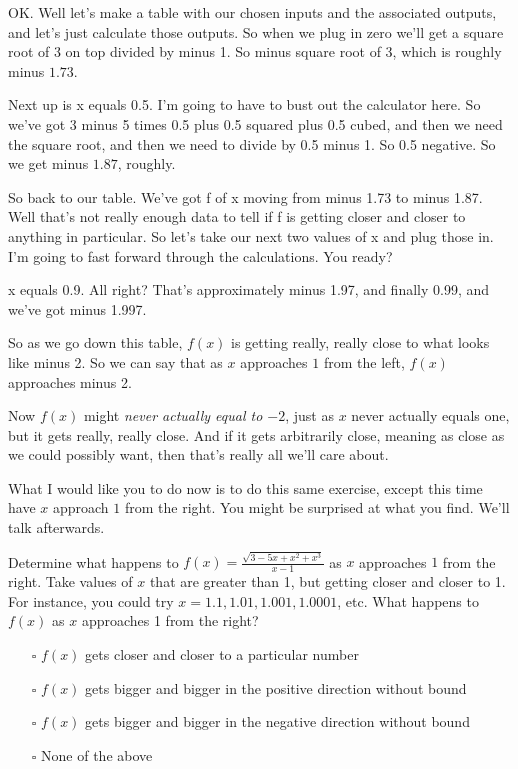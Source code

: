 \documentclass[pdftex, brazil, 12pt, twoside]{article}
\begin{document}
OK.
Well let's make a table with our chosen
inputs and the associated outputs,
and let's just calculate those outputs.
So when we plug in zero we'll get a square root of 3
on top divided by minus 1.
So minus square root of 3, which is roughly minus $1.73$.

Next up is x equals 0.5.
I'm going to have to bust out the calculator here.
So we've got 3 minus 5 times 0.5 plus 0.5 squared
plus 0.5 cubed, and then we need the square root,
and then we need to divide by 0.5 minus 1.
So 0.5 negative.
So we get minus $1.87$, roughly.

So back to our table.
We've got f of x moving from minus 1.73 to minus 1.87.
Well that's not really enough data
to tell if f is getting closer and closer to anything
in particular.
So let's take our next two values of x and plug those in.
I'm going to fast forward through the calculations.
You ready?

x equals 0.9.
All right?
That's approximately minus 1.97, and finally 0.99,
and we've got minus 1.997.

So as we go down this table, $f(x)$
is getting really, really close to what looks like minus 2.
So we can say that as $x$ approaches $1$ from the left,
$f(x)$ approaches minus 2.

Now $f(x)$ might \emph{never actually equal to $-2$},
just as $x$ never actually equals one,
but it gets really, really close.
And if it gets arbitrarily close,
meaning as close as we could possibly want,
then that's really all we'll care about.

What I would like you to do now is
to do this same exercise, except this time have $x$ approach $1$
from the right. You might be surprised at what you find.
We'll talk afterwards.

\begin{exercise}
  Determine what happens to $\displaystyle f(x) = \frac{\sqrt{3-5x+x^2+x^3}}{x-1}$
  as $x$ approaches $1$ from the right. Take values of $x$ that are greater than 1,
  but getting closer and closer to 1. For instance, you could try
  $x=1.1, 1.01, 1.001, 1.0001$, etc. What happens to $f(x)$ as $x$ approaches
  1 from the right?
\begin{itemize}[noitemsep]
\item[$\square$] $f(x)$ gets closer and closer to a particular number
\item[$\square$] $f(x)$ gets bigger and bigger in the positive direction without bound
\item[$\square$] $f(x)$ gets bigger and bigger in the negative direction without bound
\item[$\square$] None of the above
\end{itemize}
\end{exercise}
\end{document}

